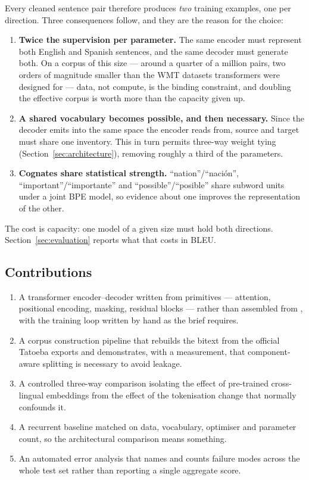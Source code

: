\documentclass[11pt,a4paper]{article}
\begin{document}
Every cleaned sentence pair therefore produces \emph{two} training examples,
one per direction. Three consequences follow, and they are the reason for the
choice:

\begin{enumerate}
  \item \textbf{Twice the supervision per parameter.} The same encoder must
    represent both English and Spanish sentences, and the same decoder must
    generate both. On a corpus of this size --- around a quarter of a million
    pairs, two orders of magnitude smaller than the WMT datasets transformers
    were designed for --- data, not compute, is the binding constraint, and
    doubling the effective corpus is worth more than the capacity given up.
  \item \textbf{A shared vocabulary becomes possible, and then necessary.}
    Since the decoder emits into the same space the encoder reads from, source
    and target must share one inventory. This in turn permits three-way weight
    tying (Section~\ref{sec:architecture}), removing roughly a third of the
    parameters.
  \item \textbf{Cognates share statistical strength.} ``nation''/``nación'',
    ``important''/``importante'' and ``possible''/``posible'' share subword
    units under a joint BPE model, so evidence about one improves the
    representation of the other.
\end{enumerate}

The cost is capacity: one model of a given size must hold both directions.
Section~\ref{sec:evaluation} reports what that costs in BLEU.

\subsection{Contributions}

\begin{enumerate}
  \item A transformer encoder--decoder written from primitives --- attention,
    positional encoding, masking, residual blocks --- rather than assembled
    from , with the training loop written by hand as
    the brief requires.
  \item A corpus construction pipeline that rebuilds the bitext from the
    official Tatoeba exports and demonstrates, with a measurement, that
    component-aware splitting is necessary to avoid leakage.
  \item A controlled three-way comparison isolating the effect of pre-trained
    cross-lingual embeddings from the effect of the tokenisation change that
    normally confounds it.
  \item A recurrent baseline matched on data, vocabulary, optimiser and
    parameter count, so the architectural comparison means something.
  \item An automated error analysis that names and counts failure modes across
    the whole test set rather than reporting a single aggregate score.
\end{enumerate}
\end{document}
